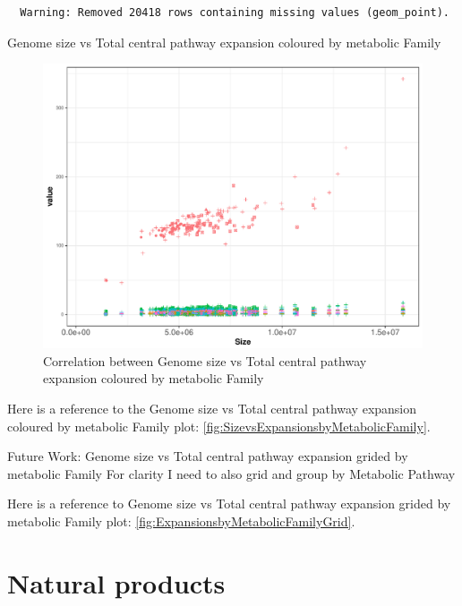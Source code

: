 \documentclass[12pt,twoside]{reedthesis}
\begin{document}
  \begin{verbatim}
  Warning: Removed 20418 rows containing missing values (geom_point).
  \end{verbatim}
  
  Genome size vs Total central pathway expansion coloured by metabolic
  Family
  
  \begin{figure}[h!tbp]
  \centering
  \includegraphics[angle = 0,scale = 0.6]{chapter5/SizevsExpansionsbyMetabolicFamily.pdf}
  \caption[Correlation between Genome size vs Total central pathway expansion coloured by metabolic Family]{\normalsize{Correlation between Genome size vs Total central pathway expansion coloured by metabolic Family}}
  \label{fig:SizevsExpansionsbyMetabolicFamily}
  \end{figure}
  
  Here is a reference to the Genome size vs Total central pathway
  expansion coloured by metabolic Family plot:
  \autoref{fig:SizevsExpansionsbyMetabolicFamily}. \clearpage 
  
  Future Work: Genome size vs Total central pathway expansion grided by
  metabolic Family For clarity I need to also grid and group by Metabolic
  Pathway
  
  Here is a reference to Genome size vs Total central pathway expansion
  grided by metabolic Family plot:
  \autoref{fig:ExpansionsbyMetabolicFamilyGrid}. \clearpage 
  
  \section{Natural products}\label{natural-products-2}
  
\end{document}
